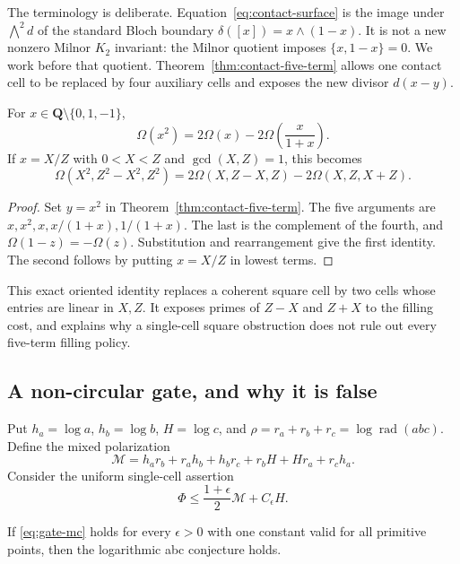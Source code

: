 The terminology is deliberate.  Equation~\eqref{eq:contact-surface} is the
image under $\bigwedge^2 d$ of the standard Bloch boundary
$\delta([x])=x\wedge(1-x)$.  It is not a new nonzero Milnor $K_2$ invariant:
the Milnor quotient imposes $\{x,1-x\}=0$.  We work before that quotient.
Theorem~\ref{thm:contact-five-term}
allows one contact cell to be replaced by four auxiliary cells and exposes
the new divisor $d(x-y)$.

\begin{proposition}
\label{prop:quadratic-peeling}
For $x\in\mathbf Q\setminus\{0,1,-1\}$,
\[
 \Omega(x^2)=2\Omega(x)-2\Omega\!\left(\frac{x}{1+x}\right).
\]
If $x=X/Z$ with $0<X<Z$ and $\gcd(X,Z)=1$, this becomes
\[
 \Omega(X^2,Z^2-X^2,Z^2)
 =2\Omega(X,Z-X,Z)-2\Omega(X,Z,X+Z).
\]
\end{proposition}
\begin{proof}
Set $y=x^2$ in Theorem~\ref{thm:contact-five-term}.  The five arguments are
$x,x^2,x,x/(1+x),1/(1+x)$.  The last is the complement of the fourth, and
$\Omega(1-z)=-\Omega(z)$.  Substitution and rearrangement give the first
identity.  The second follows by putting $x=X/Z$ in lowest terms.
\end{proof}

This exact oriented identity replaces a coherent square cell by two cells
whose entries are linear in $X,Z$.  It exposes primes of $Z-X$ and $Z+X$
to the filling cost, and explains why a single-cell square obstruction does
not rule out every five-term filling policy.

\subsection{A non-circular gate, and why it is false}

Put $h_a=\log a$, $h_b=\log b$, $H=\log c$, and
$\rho=r_a+r_b+r_c=\log\operatorname{rad}(abc)$.  Define the mixed
polarization
\[
 \mathcal M=h_ar_b+r_ah_b+h_br_c+r_bH+Hr_a+r_ch_a.
\]
Consider the uniform single-cell assertion
\begin{equation}
 \Phi\leq\frac{1+\epsilon}{2}\mathcal M+C_\epsilon H.
 \label{eq:gate-mc}
\end{equation}

\begin{proposition}
\label{prop:mc-implies-abc}
If \eqref{eq:gate-mc} holds for every $\epsilon>0$ with one constant valid
for all primitive points, then the logarithmic abc conjecture holds.
\end{proposition}

